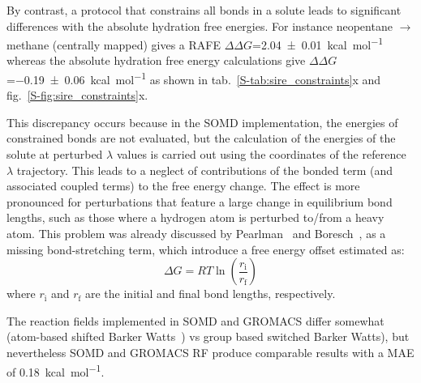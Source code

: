 \documentclass[journal=jctcce,manuscript=article]{achemso}
\begin{document}
By contrast, a protocol that constrains all bonds in a solute leads to 
significant differences with the absolute hydration free energies. For instance 
neopentane $\rightarrow$ methane (centrally mapped) gives a RAFE
$\Delta\Delta G$=\SI{2.04 +- 0.01}{kcal.mol^{-1}}  whereas the absolute 
hydration free energy calculations give $\Delta\Delta 
G$=\SI{-0.19+-0.06}{kcal.mol^{-1}} as shown in 
tab.~\ref{S-tab:sire_constraints}x and fig.~\ref{S-fig:sire_constraints}x.

This discrepancy occurs because in the SOMD implementation, the energies of 
constrained bonds are not evaluated, but the calculation of the energies of the 
solute at perturbed $\lambda$ values is carried out using the coordinates of 
the reference $\lambda$ trajectory. This leads to a neglect of contributions of 
the bonded term (and associated coupled terms) to the free energy change. The 
effect is more pronounced for perturbations that feature a large change in 
equilibrium bond lengths, such as those where a hydrogen atom is perturbed 
to/from a heavy atom.
This problem was already discussed by Pearlman~\cite{pearlman1991overlooked} 
and Boresch~\cite{doi:10.1021/jp981628n, doi:10.1021/jp981629f}, as a missing 
bond-stretching term, which introduce a free energy offset estimated as:
\begin{equation}
 \label{eq:allbondserror}
 \Delta G= RT\ln \left ( \frac{r_{\mathrm{i}}}{r_\mathrm{f}} \right)  
\end{equation}
where $r_{\mathrm{i}}$ and $r_{\mathrm{f}}$ are the initial and final bond 
lengths, respectively. 

The reaction fields implemented in SOMD and GROMACS differ somewhat (atom-based 
shifted Barker Watts~\cite{doi:10.1080/00268977300102101}) vs group based 
switched Barker Watts), but nevertheless SOMD and GROMACS RF produce comparable 
results with a MAE of \SI{0.18}{kcal.mol^{-1}}.
\end{document}
